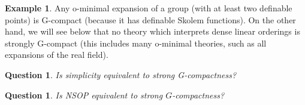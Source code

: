 \documentclass[final,a4paper,12pt]{amsart}
\newtheorem{qu}[con]{Question}
\theoremstyle{remark}
\theoremstyle{definition}
\newtheorem{ex}[thm]{Example}
\begin{document}
	\begin{ex}
		Any o-minimal expansion of a group (with at least two definable points) is G-compact (because it has definable Skolem functions). On the other hand, we will see below that no theory which interprets dense linear orderings is strongly G-compact (this includes many o-minimal theories, such as all expansions of the real field).
	\end{ex}
	
	
	
	
	\begin{qu}
		Is simplicity equivalent to strong G-compactness?
	\end{qu}
	
	\begin{qu}
		Is NSOP equivalent to strong $G$-compactness?
	\end{qu}
	
\end{document}

